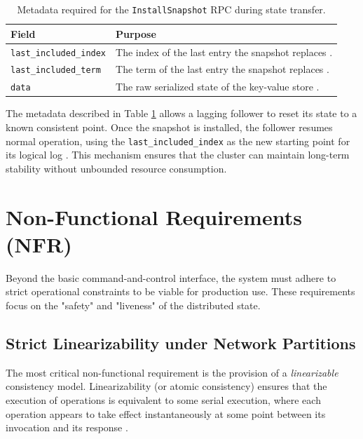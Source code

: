 \begin{table}[h]
\centering
\caption{Metadata required for the \texttt{InstallSnapshot} RPC during state transfer.}
\label{tab:snapshot_metadata}
\begin{tabular}{|l|p{8cm}|}
\hline
\textbf{Field} & \textbf{Purpose} \\ \hline
\texttt{last\_included\_index} & The index of the last entry the snapshot replaces \cite{14}. \\ \hline
\texttt{last\_included\_term} & The term of the last entry the snapshot replaces \cite{14}. \\ \hline
\texttt{data} & The raw serialized state of the key-value store \cite{15}. \\ \hline
\end{tabular}
\end{table}

The metadata described in Table \ref{tab:snapshot_metadata} allows a lagging follower to reset its state to a known consistent point. Once the snapshot is installed, the follower resumes normal operation, using the \texttt{last\_included\_index} as the new starting point for its logical log \cite{Raft2014}. This mechanism ensures that the cluster can maintain long-term stability without unbounded resource consumption.

\section{Non-Functional Requirements (NFR)}
Beyond the basic command-and-control interface, the system must adhere to strict operational constraints to be viable for production use. These requirements focus on the "safety" and "liveness" of the distributed state.

\subsection{Strict Linearizability under Network Partitions}
The most critical non-functional requirement is the provision of a \textit{linearizable} consistency model. Linearizability (or atomic consistency) ensures that the execution of operations is equivalent to some serial execution, where each operation appears to take effect instantaneously at some point between its invocation and its response \cite{Linearizability1990}.

